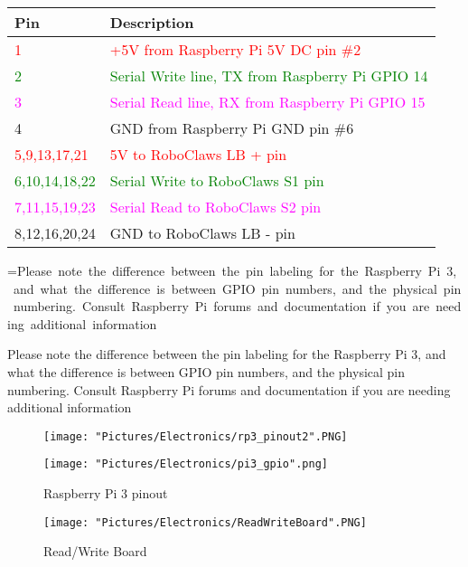 \documentclass[12pt]{article}
\makeatletter
\newcommand{\mybox}[1]{%
  \setbox0=\hbox{#1}%
  \setlength{\@tempdima}{\dimexpr\wd0+13pt}%
  \begin{tcolorbox}[colframe=mycolor,boxrule=0.5pt,arc=4pt,
      left=6pt,right=6pt,top=6pt,bottom=6pt,boxsep=0pt,width=0.95\textwidth]
    #1
  \end{tcolorbox}
}
\makeatother
\begin{document}
\bigskip

\begin{tabular}[2] {| p{2.5cm} | p{11cm} |}
	\hline
	\textbf{Pin} & \textbf{Description} \\ \hline
	\textcolor{red}{1} & \textcolor{red}{+5V from Raspberry Pi 5V DC pin \#2} \\ \hline
	\textcolor{green}{2} & \textcolor{green}{Serial Write line, TX from Raspberry Pi GPIO 14} \\ \hline
	\textcolor{magenta}{3} & \textcolor{magenta}{Serial Read line, RX from Raspberry Pi GPIO 15}	\\ \hline
	4 & GND from Raspberry Pi GND pin \#6 \\ \hline
	\textcolor{red}{5,9,13,17,21} & \textcolor{red}{5V to RoboClaws LB + pin} \\ \hline
	\textcolor{green}{6,10,14,18,22} & \textcolor{green}{Serial Write to RoboClaws S1 pin} \\ \hline
	\textcolor{magenta}{7,11,15,19,23} & \textcolor{magenta}{Serial Read to RoboClaws S2 pin} \\ \hline
	8,12,16,20,24 & GND to RoboClaws LB - pin \\ \hline 
\end{tabular}

\bigskip 

\mybox{Please note the difference between the pin labeling for the Raspberry Pi 3, and what the difference is between GPIO pin numbers, and the physical pin numbering. Consult Raspberry Pi forums and documentation if you are needing additional information}


\begin{figure}[H]
 	\centering
  	\begin{minipage}[b]{0.35\textwidth}
		\texttt{[image: "Pictures/Electronics/rp3\_pinout2".PNG]}
  	\end{minipage}
  	\hfill
  	\begin{minipage}[b]{0.45\textwidth}
    		\texttt{[image: "Pictures/Electronics/pi3\_gpio".png]}
  	\end{minipage}
	\caption{Raspberry Pi 3 pinout}
	\label{RPi 3 pinout}
\end{figure}

\begin{figure}[H]
 	\centering
	\texttt{[image: "Pictures/Electronics/ReadWriteBoard".PNG]}
 	\caption{Read/Write Board}
	\label{Read/Write Board}
\end{figure}
\end{document}
